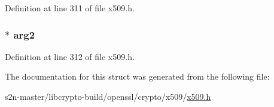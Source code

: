 Definition at line 311 of file x509.\+h.

\subsubsection[{\texorpdfstring{arg2}{arg2}}]{ $\ast$ arg2}\hypertarget{structx509__trust__st_a018e28f301c79a4512596db6ead532f3}{}\label{structx509__trust__st_a018e28f301c79a4512596db6ead532f3}


Definition at line 312 of file x509.\+h.



The documentation for this struct was generated from the following file\+:\begin{DoxyCompactItemize}
\item 
s2n-\/master/libcrypto-\/build/openssl/crypto/x509/\hyperlink{crypto_2x509_2x509_8h}{x509.\+h}\end{DoxyCompactItemize}
